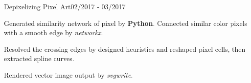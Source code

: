 \begin{rSubsection}{Depixelizing Pixel Art}{02/2017 - 03/2017}{}{} 
\item Generated similarity network of pixel by {\bf Python}. Connected similar color pixels with a smooth edge by \emph{networkx}. 
\item Resolved the crossing edges by designed heuristics and reshaped pixel cells, then extracted spline curves. 
\item Rendered vector image output by \emph{svgwrite}.
\end{rSubsection} 